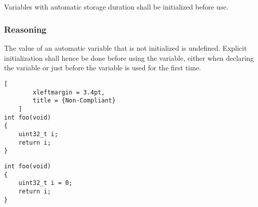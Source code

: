 \subsection*{\codingRule{}}

Variables with automatic storage duration shall be initialized before use.

\subsubsection{Reasoning}

The value of an automatic variable that is not initialized is undefined. Explicit initialization shall hence be done before using the variable, either when declaring the variable or just before the variable is used for the first time.

\noindent
\begin{minipage}[t]{\codelstwidth\linewidth}
	\begin{lstlisting}[
        xleftmargin = 3.4pt,
		title = {Non-Compliant}
	]
int foo(void)
{
	uint32_t i;
	return i;
}
\end{lstlisting}
\end{minipage}
\hfill
\begin{minipage}[t]{\codelstwidth\linewidth}
\begin{lstlisting}[title={Compliant}]
int foo(void)
{
	uint32_t i = 0;
	return i;
}
\end{lstlisting}
\end{minipage}